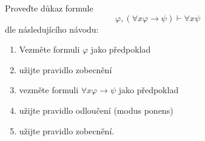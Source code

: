 Proveďte důkaz formule
$$\varphi ,(\forall x\varphi\rightarrow \psi )\vdash \forall x \psi$$
dle následujícího návodu:

\begin{enumerate}
  \item Vezměte formuli $\varphi$ jako předpoklad
  \item užijte pravidlo zobecnění
  \item vezměte formuli $\forall x \varphi \rightarrow \psi $ jako předpoklad
  \item užijte pravidlo odloučení (modus ponens)
  \item užijte pravidlo zobecnění.
\end{enumerate}
